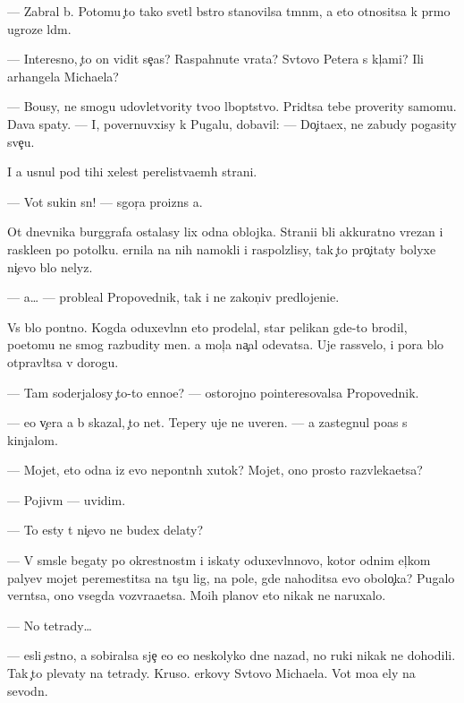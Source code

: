 \documentclass[10pt]{book}
\begin{document}
— Zabral b{\yi}. Potomu {\c}to tako{\y} svetl{\yi}{\y} b{\yi}stro stanovilsa t{\e}mn{\yi}m, a eto otnositsa k pr{\ia}mo{\y} ugroze l{\iu}d{\ia}m.

— Interesno, {\c}to on vidit se{\y}{\c}as? Raspahnut{\yi}{\y}e vrata? Sv{\ia}tovo Petera s kl{\iu}{\c}ami? Ili arhangela Michaela?

— Bo{\y}usy, ne smogu udovletvority tvo{\y}o l{\iu}bop{\yi}tstvo. Prid{\e}tsa tebe proverity samomu. Dava{\y} spaty. — I, povernuvxisy k Pugalu, dobavil: — Do{\c}ita{\y}ex, ne zabudy pogasity sve{\c}u.

I {\y}a usnul pod tihi{\y} xelest perelist{\yi}va{\y}em{\yi}h strani{\q}.

— Vot sukin s{\yi}n! — sgor{\ia}{\c}a proizn{\e}s {\y}a.

Ot dnevnika burggrafa ostalasy lix odna oblojka. Strani{\q}i b{\yi}li akkuratno v{\yi}rezan{\yi} i raskle{\y}en{\yi} po potolku. {\C}ernila na nih namokli i raspolzlisy, tak {\c}to pro{\c}itaty bolyxe ni{\c}evo b{\yi}lo nelyz{\ia}.

— {\Y}a… — proble{\y}al Propovednik, tak i ne zakon{\c}iv predlojeni{\y}e.

Vs{\e} b{\yi}lo pon{\ia}tno. Kogda oduxevl{\e}nn{\yi}{\y} eto prodelal, star{\yi}{\y} pelikan gde-to brodil, poetomu ne smog razbudity men{\ia}. {\Y}a mol{\c}a na{\c}al odevatsa. Uje rassvelo, i pora b{\yi}lo otpravl{\ia}tsa v dorogu.

— Tam soderjalosy {\c}to-to {\q}enno{\y}e? — ostorojno pointeresovalsa Propovednik.

— {\Y}e{\x}o v{\c}era {\y}a b{\yi} skazal, {\c}to net. Tepery uje ne uveren. — {\Y}a zastegnul po{\y}as s kinjalom.

— Mojet, eto odna iz {\y}evo nepon{\ia}tn{\yi}h xutok? Mojet, ono prosto razvleka{\y}etsa?

— Pojiv{\e}m — uvidim.

— To {\y}esty t{\yi} ni{\c}evo ne budex delaty?

— V sm{\yi}sle begaty po okrestnost{\ia}m i iskaty oduxevl{\e}nnovo, kotor{\yi}{\y} odnim {\x}el{\c}kom paly{\q}ev mojet peremestitsa na t{\yi}s{\ia}{\c}u lig, na pole, gde nahoditsa {\y}evo obolo{\c}ka? Pugalo vern{\e}tsa, ono vsegda vozvra{\x}a{\y}etsa. Mo{\y}ih planov eto nikak ne naruxalo.

— No tetrady…

— {\Y}esli {\c}estno, {\y}a sobiralsa sje{\c} {\y}e{\y}o {\y}e{\x}o neskolyko dne{\y} nazad, no ruki nikak ne dohodili. Tak {\c}to plevaty na tetrady. Kruso. {\Q}erkovy Sv{\ia}tovo Michaela. Vot mo{\y}a {\q}ely na sevodn{\ia}.
\end{document}
